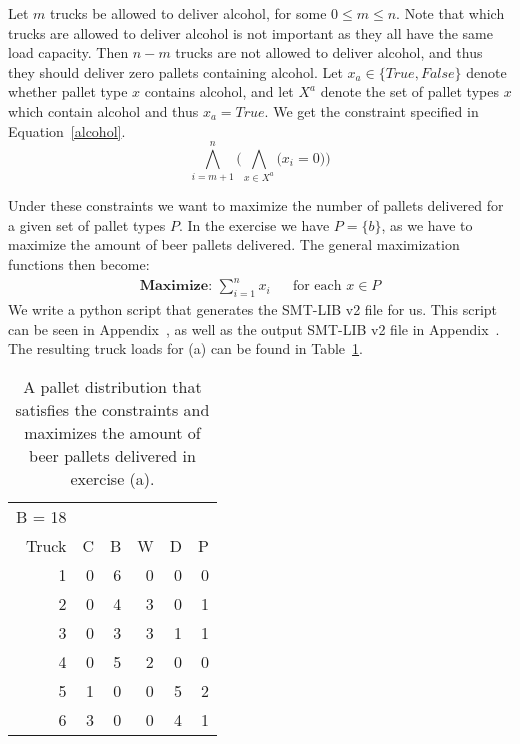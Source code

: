 Let $m$ trucks be allowed to deliver alcohol, for some $0 \leq m \leq n$. Note that which trucks are allowed to deliver alcohol is not important as they all have the same load capacity. Then $n - m$ trucks are not allowed to deliver alcohol, and thus they should deliver zero pallets containing alcohol. Let $x_a \in \{\textit{True}, \textit{False}\}$ denote whether pallet type $x$ contains alcohol, and let $X^{a}$ denote the set of pallet types $x$ which contain alcohol and thus $x_a = \textit{True}$. We get the constraint specified in Equation~\ref{alcohol}.
\begin{equation}
    \label{alcohol}
    \bigwedge^n_{i=m+1} \bigg(\bigwedge_{x \in X^a} \big( x_i = 0 \big)\bigg)
\end{equation}

Under these constraints we want to maximize the number of pallets delivered for a given set of pallet types $P$. In the exercise we have $P = \{b\}$, as we have to maximize the amount of beer pallets delivered. The general maximization functions then become:
\begin{equation}
    \begin{aligned}
    \textbf{Maximize: } \sum^n_{i=1} x_i && \text{for each }x \in P
    \end{aligned}
\end{equation}
We write a python script that generates the SMT-LIB v2 file for us. This script can be seen in Appendix~\Cref{}, as well as the output SMT-LIB v2 file in Appendix~\Cref{}.
The resulting truck loads for (a) can be found in Table~\ref{tab:a_table}.

\begin{table}[!ht]
  \begin{tabular}{r | r r r r r}
    B = 18\\
    Truck &  C &  B &  W &  D &  P\\\hline
        1 &  0 &  6 &  0 &  0 &  0\\
        2 &  0 &  4 &  3 &  0 &  1\\
        3 &  0 &  3 &  3 &  1 &  1\\
        4 &  0 &  5 &  2 &  0 &  0\\
        5 &  1 &  0 &  0 &  5 &  2\\
        6 &  3 &  0 &  0 &  4 &  1\\
  \end{tabular}
  \caption{A pallet distribution that satisfies the constraints and maximizes the amount of beer pallets delivered in exercise (a).}
  \label{tab:a_table}
\end{table}

